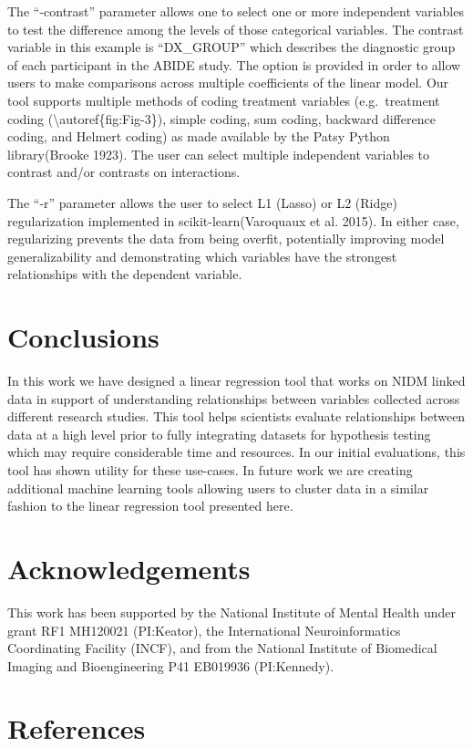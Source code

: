 The ``-contrast'' parameter allows one to select one or more independent
variables to test the difference among the levels of those categorical
variables. The contrast variable in this example is ``DX\_GROUP'' which
describes the diagnostic group of each participant in the ABIDE study.
The option is provided in order to allow users to make comparisons
across multiple coefficients of the linear model. Our tool supports
multiple methods of coding treatment variables (e.g.~treatment coding
(\textbackslash{}autoref\{fig:Fig-3\}), simple coding, sum coding,
backward difference coding, and Helmert coding) as made available by the
Patsy Python library(Brooke 1923). The user can select multiple
independent variables to contrast and/or contrasts on interactions.

The ``-r'' parameter allows the user to select L1 (Lasso) or L2 (Ridge)
regularization implemented in scikit-learn(Varoquaux et al. 2015). In
either case, regularizing prevents the data from being overfit,
potentially improving model generalizability and demonstrating which
variables have the strongest relationships with the dependent variable.

\section{Conclusions}

In this work we have designed a linear regression tool that works on
NIDM linked data in support of understanding relationships between
variables collected across different research studies. This tool helps
scientists evaluate relationships between data at a high level prior to
fully integrating datasets for hypothesis testing which may require
considerable time and resources. In our initial evaluations, this tool
has shown utility for these use-cases. In future work we are creating
additional machine learning tools allowing users to cluster data in a
similar fashion to the linear regression tool presented here.

\section{Acknowledgements}

This work has been supported by the National Institute of Mental Health
under grant RF1 MH120021 (PI:Keator), the International Neuroinformatics
Coordinating Facility (INCF), and from the National Institute of
Biomedical Imaging and Bioengineering P41 EB019936 (PI:Kennedy).

\section{References}

